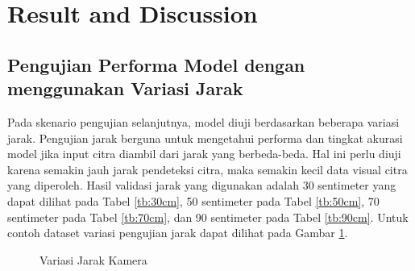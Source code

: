 \section{Result and Discussion}
\label{sec:resultanddiscussion}

\subsection{Pengujian Performa Model dengan menggunakan Variasi Jarak}

Pada skenario pengujian selanjutnya, model diuji berdasarkan beberapa variasi jarak. Pengujian jarak berguna untuk mengetahui performa dan tingkat akurasi model jika input citra diambil dari jarak yang berbeda-beda. Hal ini perlu diuji karena semakin jauh jarak pendeteksi citra, maka semakin kecil data visual citra yang diperoleh. Hasil validasi jarak yang digunakan adalah 30 sentimeter yang dapat dilihat pada Tabel \ref{tb:30cm}, 50 sentimeter pada Tabel \ref{tb:50cm}, 70 sentimeter pada Tabel \ref{tb:70cm}, dan 90 sentimeter pada Tabel \ref{tb:90cm}. Untuk contoh dataset variasi pengujian jarak dapat dilihat pada Gambar \ref{fig:Variasi Jarak Kamera}.

\begin{figure}[H]
  \centering
    \hfil 

    \hfil

  \caption{Variasi Jarak Kamera}
  \label{fig:Variasi Jarak Kamera}
\end{figure}

